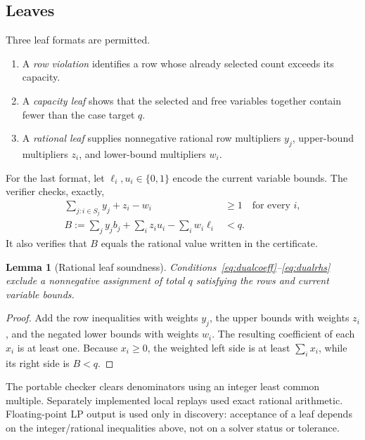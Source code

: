 \documentclass[11pt]{article}
\newtheorem{lemma}[theorem]{Lemma}
\theoremstyle{definition}
\begin{document}
\subsection{Leaves}
Three leaf formats are permitted.
\begin{enumerate}[leftmargin=*]
\item A \emph{row violation} identifies a row whose already selected count exceeds its capacity.
\item A \emph{capacity leaf} shows that the selected and free variables together contain fewer than the case target $q$.
\item A \emph{rational leaf} supplies nonnegative rational row multipliers $y_j$, upper-bound multipliers $z_i$, and lower-bound multipliers $w_i$.
\end{enumerate}
For the last format, let $\ell_i,u_i\in\{0,1\}$ encode the current variable bounds. The verifier checks, exactly,
\begin{align}
 \sum_{j:i\in S_j}y_j+z_i-w_i&\geq1\quad\text{for every }i,\label{eq:dualcoeff}\\
 B:=\sum_j y_jb_j+\sum_i z_iu_i-\sum_i w_i\ell_i&<q.\label{eq:dualrhs}
\end{align}
It also verifies that $B$ equals the rational value written in the certificate.

\begin{lemma}[Rational leaf soundness]
Conditions~\eqref{eq:dualcoeff}--\eqref{eq:dualrhs} exclude a nonnegative assignment of total $q$ satisfying the rows and current variable bounds.
\end{lemma}
\begin{proof}
Add the row inequalities with weights $y_j$, the upper bounds with weights $z_i$, and the negated lower bounds with weights $w_i$. The resulting coefficient of each $x_i$ is at least one. Because $x_i\geq0$, the weighted left side is at least $\sum_i x_i$, while its right side is $B<q$.
\end{proof}

The portable checker clears denominators using an integer least common multiple. Separately implemented local replays used exact rational arithmetic. Floating-point LP output is used only in discovery: acceptance of a leaf depends on the integer/rational inequalities above, not on a solver status or tolerance.
\end{document}
